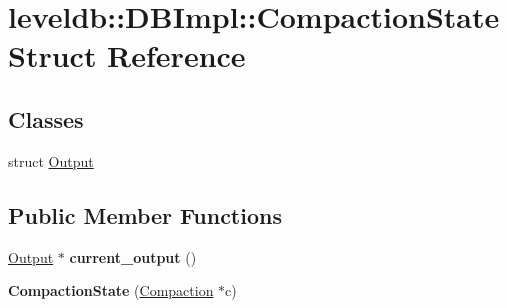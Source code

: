 \hypertarget{structleveldb_1_1_d_b_impl_1_1_compaction_state}{}\section{leveldb\+::D\+B\+Impl\+::Compaction\+State Struct Reference}
\label{structleveldb_1_1_d_b_impl_1_1_compaction_state}
\subsection*{Classes}
\begin{DoxyCompactItemize}
\item 
struct \mbox{\hyperlink{structleveldb_1_1_d_b_impl_1_1_compaction_state_1_1_output}{Output}}
\end{DoxyCompactItemize}
\subsection*{Public Member Functions}
\begin{DoxyCompactItemize}
\item 
\mbox{\label{structleveldb_1_1_d_b_impl_1_1_compaction_state_ac371d4a1422f4c1c122cfd39e97a6b95}} 
\mbox{\hyperlink{structleveldb_1_1_d_b_impl_1_1_compaction_state_1_1_output}{Output}} $\ast$ {\bfseries current\+\_\+output} ()
\item 
\mbox{\label{structleveldb_1_1_d_b_impl_1_1_compaction_state_a3f66a31afd7f73ef5021337d1ec626b6}} 
{\bfseries Compaction\+State} (\mbox{\hyperlink{classleveldb_1_1_compaction}{Compaction}} $\ast$c)
\end{DoxyCompactItemize}
